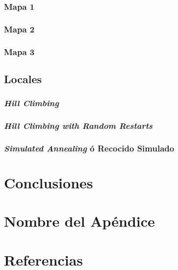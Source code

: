 \documentclass[12pt, letterpaper]{article}
\begin{document}
        \subsubsection{Mapa 1}

        \subsubsection{Mapa 2}

        \subsubsection{Mapa 3}

    \subsection{Locales}

        \subsubsection{\textit{Hill Climbing}}

        \subsubsection{\textit{Hill Climbing with Random Restarts}}

        \subsubsection{\textit{Simulated Annealing} ó Recocido Simulado}

\section{Conclusiones}

\appendix

\section{Nombre del Apéndice}

\section{Referencias}



\end{document}
